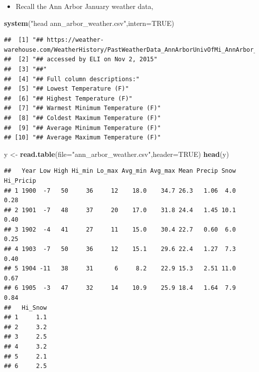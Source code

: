 \documentclass[]{article}
\newenvironment{Shaded}{\begin{snugshade}}{\end{snugshade}}
\newcommand{\KeywordTok}[1]{\textcolor[rgb]{0.13,0.29,0.53}{\textbf{#1}}}
\newcommand{\DataTypeTok}[1]{\textcolor[rgb]{0.13,0.29,0.53}{#1}}
\newcommand{\StringTok}[1]{\textcolor[rgb]{0.31,0.60,0.02}{#1}}
\newcommand{\OtherTok}[1]{\textcolor[rgb]{0.56,0.35,0.01}{#1}}
\newcommand{\NormalTok}[1]{#1}
\providecommand{\tightlist}{%
  \setlength{\itemsep}{0pt}\setlength{\parskip}{0pt}}
\begin{document}
\begin{itemize}
\tightlist
\item
  Recall the Ann Arbor January weather data,
\end{itemize}

\begin{Shaded}
\begin{Highlighting}[]
\KeywordTok{system}\NormalTok{(}\StringTok{"head ann_arbor_weather.csv"}\NormalTok{,}\DataTypeTok{intern=}\OtherTok{TRUE}\NormalTok{)}
\end{Highlighting}
\end{Shaded}

\begin{verbatim}
##  [1] "## https://weather-warehouse.com/WeatherHistory/PastWeatherData_AnnArborUnivOfMi_AnnArbor_MI_January.html"
##  [2] "## accessed by ELI on Nov 2, 2015"                                                                        
##  [3] "##"                                                                                                       
##  [4] "## Full column descriptions:"                                                                             
##  [5] "## Lowest Temperature (F)"                                                                                
##  [6] "## Highest Temperature (F)"                                                                               
##  [7] "## Warmest Minimum Temperature (F)"                                                                       
##  [8] "## Coldest Maximum Temperature (F)"                                                                       
##  [9] "## Average Minimum Temperature (F)"                                                                       
## [10] "## Average Maximum Temperature (F)"
\end{verbatim}

\begin{Shaded}
\begin{Highlighting}[]
\NormalTok{y <-}\StringTok{ }\KeywordTok{read.table}\NormalTok{(}\DataTypeTok{file=}\StringTok{"ann_arbor_weather.csv"}\NormalTok{,}\DataTypeTok{header=}\OtherTok{TRUE}\NormalTok{)}
\KeywordTok{head}\NormalTok{(y)}
\end{Highlighting}
\end{Shaded}

\begin{verbatim}
##   Year Low High Hi_min Lo_max Avg_min Avg_max Mean Precip Snow Hi_Pricip
## 1 1900  -7   50     36     12    18.0    34.7 26.3   1.06  4.0      0.28
## 2 1901  -7   48     37     20    17.0    31.8 24.4   1.45 10.1      0.40
## 3 1902  -4   41     27     11    15.0    30.4 22.7   0.60  6.0      0.25
## 4 1903  -7   50     36     12    15.1    29.6 22.4   1.27  7.3      0.40
## 5 1904 -11   38     31      6     8.2    22.9 15.3   2.51 11.0      0.67
## 6 1905  -3   47     32     14    10.9    25.9 18.4   1.64  7.9      0.84
##   Hi_Snow
## 1     1.1
## 2     3.2
## 3     2.5
## 4     3.2
## 5     2.1
## 6     2.5
\end{verbatim}
\end{document}
